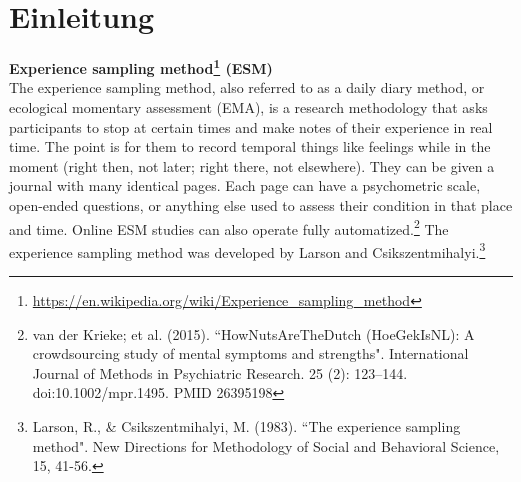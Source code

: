 \documentclass[a4paper]{scrreprt}
\begin{document}
 
 
    \tableofcontents
    
    \chapter{Einleitung}
        {\bf \large Experience sampling method\footnote{\url{https://en.wikipedia.org/wiki/Experience_sampling_method}} (ESM)}\\
        
        The experience sampling method, also referred to as a daily diary method, or ecological momentary assessment (EMA), is a research methodology that asks participants to stop at certain times and make notes of their experience in real time. The point is for them to record temporal things like feelings while in the moment (right then, not later; right there, not elsewhere). They can be given a journal with many identical pages. Each page can have a psychometric scale, open-ended questions, or anything else used to assess their condition in that place and time. Online ESM studies can also operate fully automatized.\footnote{van der Krieke; et al. (2015). ``HowNutsAreTheDutch (HoeGekIsNL): A crowdsourcing study of mental symptoms and strengths". International Journal of Methods in Psychiatric Research. 25 (2): 123–144. doi:10.1002/mpr.1495. PMID 26395198} The experience sampling method was developed by Larson and Csikszentmihalyi.\footnote{Larson, R., \& Csikszentmihalyi, M. (1983). ``The experience sampling method". New Directions for Methodology of Social and Behavioral Science, 15, 41-56.} \\
\end{document}
